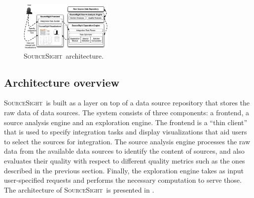 \documentclass{vldb}
\newcommand\system{\textsc{SourceSight}}
\begin{document}
\begin{figure}[h]
    \centering
    \includegraphics[width=0.4\textwidth]{fig/srcsightOver}
    	\vspace{-10pt}
    \caption{\system~architecture.}
    \label{fig:architecture}
    	\vspace{-10pt}
\end{figure}

\subsection{Architecture overview}
\system~is built as a layer on top of a data source repository that stores the raw data of data sources. The system consists of three components: a frontend, a source analysis engine and an exploration engine. The frontend is a ``thin client'' that is used to specify integration tasks and display visualizations that aid users to select the sources for integration. The source analysis engine processes the raw data from the available data sources to identify the content of sources, and also evaluates their quality with respect to different quality metrics such as the ones described in the previous section. Finally, the exploration engine takes as input user-specified requests and performs the necessary computation to serve those. The architecture of \system~is presented in . 
\end{document}
